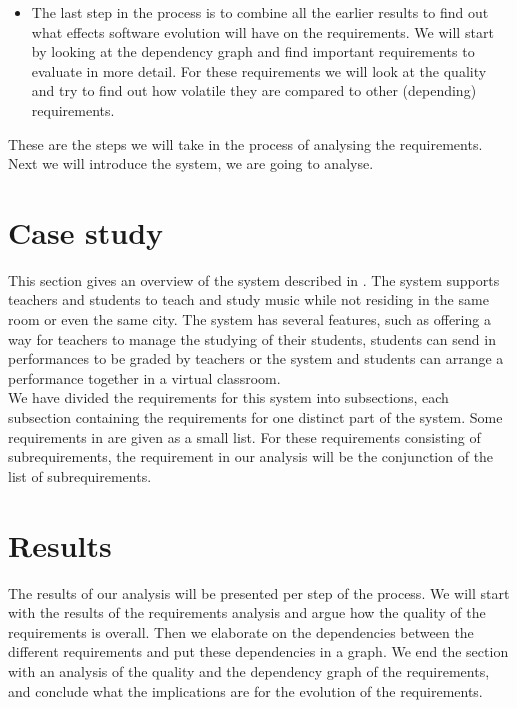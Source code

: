 \documentclass[a4paper,11pt]{article}
\begin{document}
\begin{itemize}
			\item The last step in the process is to combine all the earlier results to find out what effects software evolution will have on the requirements. We will start by looking at the dependency graph and find important requirements to evaluate in more detail. For these requirements we will look at the quality and try to find out how volatile they are compared to other (depending) requirements.
		\end{itemize} 
		
		These are the steps we will take in the process of analysing the requirements. Next we will introduce the system, we are going to analyse.
	
	\section{Case study}
	\label{sec:case}
		This section gives an overview of the system described in \cite{VEMUS}. The system supports teachers and students to teach and study music while not residing in the same room or even the same city. The system has several features, such as offering a way for teachers to manage the studying of their students, students can send in performances to be graded by teachers or the system and students can arrange a performance together in a virtual classroom. \\
		We have divided the requirements for this system into subsections, each subsection containing the requirements for one distinct part of the system. Some requirements in \cite{VEMUS} are given as a small list. For these requirements consisting of subrequirements, the requirement in our analysis will be the conjunction of the list of subrequirements. \\
	
	\section{Results}
		The results of our analysis will be presented per step of the process. We will start with the results of the requirements analysis and argue how the quality of the requirements is overall. Then we elaborate on the dependencies between the different requirements and put these dependencies in a graph. We end the section with an analysis of the quality and the dependency graph of the requirements, and conclude what the implications are for the evolution of the requirements. \\
\end{document}
